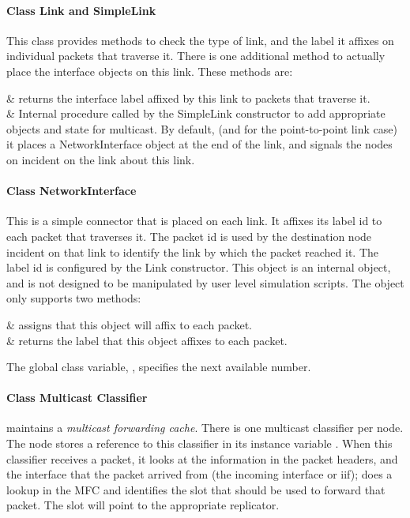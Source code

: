 \paragraph{Class Link and SimpleLink}
This class provides methods to check the type of link, and the label it 
affixes on individual packets that traverse it.
There is one additional method to actually place the interface objects on this link.
These methods are:
\begin{alist}
 & 
	returns the interface label affixed by this link to packets
	that traverse it. \\
 & 
	Internal procedure called by the SimpleLink constructor to add
	appropriate objects and state for multicast.  By default, (and
	for the point-to-point link case) it places a NetworkInterface
	object at the end of the link, and signals the nodes on
	incident on the link about this link.\\
\end{alist}

\paragraph{Class NetworkInterface}
This is a simple connector that is placed on each link.  It affixes
its label id to each packet that traverses it.  The packet id is used
by the destination node incident on that link to identify the link by
which the packet reached it.  The label id is configured by the Link
constructor.  This object is an internal object, and is not designed
to be manipulated by user level simulation scripts.  The object only
supports two methods:
\begin{alist}
 & 
	assigns  that this object will affix to each packet. \\
 & 
	returns the label that this object affixes to each packet.\\
\end{alist}
The global class variable, , specifies the next
available  number.

\paragraph{Class Multicast Classifier}
 maintains a \emph{multicast forwarding
cache}.  There is one multicast classifier per node. The node stores a
reference to this classifier in its instance variable
. When this classifier receives a packet, it
looks at the  information in the packet headers,
and the interface that the packet arrived from (the incoming interface
or iif); does a lookup in the MFC and identifies the slot that should
be used to forward that packet.  The slot will point to the
appropriate replicator.


